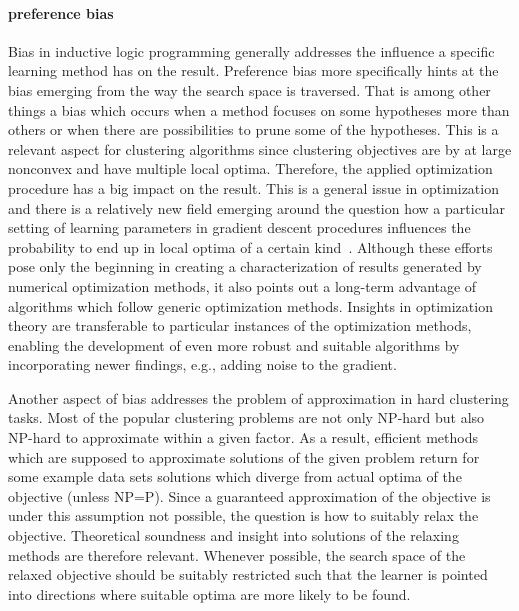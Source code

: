 \paragraph{preference bias} Bias in inductive logic programming generally addresses the influence a specific learning method has on the result. Preference bias more specifically hints at the bias emerging from the way the search space is traversed. That is among other things a bias which occurs when a method focuses on some hypotheses more than others or when there are possibilities to prune some of the hypotheses.  
This is a relevant aspect for clustering algorithms since clustering objectives are by at large nonconvex and have multiple local optima. Therefore, the applied optimization procedure has a big impact on the result. This is a general issue in optimization and there is a relatively new field emerging around the question how a particular setting of learning parameters 
in gradient descent procedures influences the probability to end up in local optima of a certain kind~\citep{henning2012quasi,henning2015probabilistic}. Although these efforts pose only the beginning in creating a characterization of results generated by numerical optimization methods, it also points out a long-term advantage of algorithms which follow generic optimization methods. Insights in optimization theory are transferable to particular instances of the optimization methods, enabling the development of even more robust and suitable algorithms by incorporating newer findings, e.g., adding noise to the gradient\citep{jin2017escape,hennig2013fast}.

Another aspect of bias addresses the problem of approximation in hard clustering tasks. Most of the popular clustering problems are not only NP-hard but also NP-hard to approximate within a given factor. As a result, efficient methods which are supposed to approximate solutions of the given problem return for some example data sets solutions which diverge from actual optima of the objective (unless NP=P). Since a guaranteed approximation of the objective is under this assumption not possible, the question is how to suitably relax the objective. Theoretical soundness and insight into solutions of the relaxing methods are therefore relevant. Whenever possible, the search space of the relaxed objective should be suitably restricted such that the learner is pointed into directions where suitable optima are more likely to be found. 

